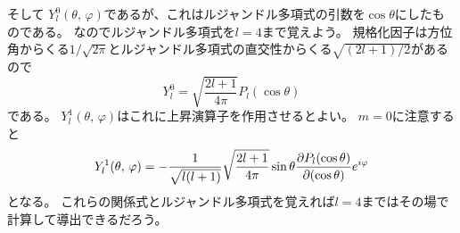 \documentclass[../master.tex]{subfiles}
\begin{document}

そして
\(Y_l^0(\theta,\,\varphi)\)であるが、これはルジャンドル多項式の引数を\(\cos\theta\)にしたものである。
なのでルジャンドル多項式を\(l=4\)まで覚えよう。
規格化因子は方位角からくる\(1/\sqrt{2\pi}\)とルジャンドル多項式の直交性からくる\(\sqrt{(2l+1)/2}\)があるので
\begin{equation}
	Y_l^0 = \sqrt{\frac{2l+1}{4\pi}} P_l(\cos\theta)
\end{equation}
である。
\(Y_l^1(\theta,\,\varphi)\)はこれに上昇演算子を作用させるとよい。
\(m=0\)に注意すると
\begin{equation}
	Y_l^1(\theta,\,\varphi) = -\frac{1}{\sqrt{l(l+1)}}\sqrt{\frac{2l+1}{4\pi}}\sin\theta\pdv{P_l(\cos\theta)}{(\cos\theta)}e^{i\varphi}
\end{equation}
となる。
これらの関係式とルジャンドル多項式を覚えれば\(l=4\)まではその場で計算して導出できるだろう。
\end{document}
